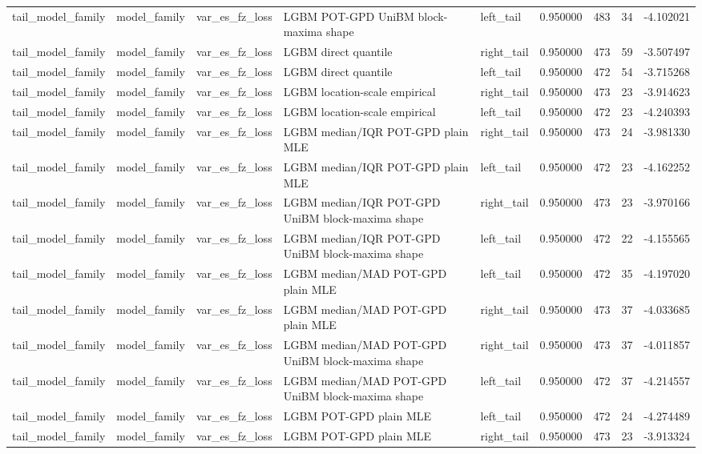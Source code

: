 \begin{tabular}{lllllrrr}
tail\_model\_family & model\_family & var\_es\_fz\_loss & LGBM POT-GPD UniBM block-maxima shape & left\_tail & 0.950000 & 483 & 34 & -4.102021 \\
tail\_model\_family & model\_family & var\_es\_fz\_loss & LGBM direct quantile & right\_tail & 0.950000 & 473 & 59 & -3.507497 \\
tail\_model\_family & model\_family & var\_es\_fz\_loss & LGBM direct quantile & left\_tail & 0.950000 & 472 & 54 & -3.715268 \\
tail\_model\_family & model\_family & var\_es\_fz\_loss & LGBM location-scale empirical & right\_tail & 0.950000 & 473 & 23 & -3.914623 \\
tail\_model\_family & model\_family & var\_es\_fz\_loss & LGBM location-scale empirical & left\_tail & 0.950000 & 472 & 23 & -4.240393 \\
tail\_model\_family & model\_family & var\_es\_fz\_loss & LGBM median/IQR POT-GPD plain MLE & right\_tail & 0.950000 & 473 & 24 & -3.981330 \\
tail\_model\_family & model\_family & var\_es\_fz\_loss & LGBM median/IQR POT-GPD plain MLE & left\_tail & 0.950000 & 472 & 23 & -4.162252 \\
tail\_model\_family & model\_family & var\_es\_fz\_loss & LGBM median/IQR POT-GPD UniBM block-maxima shape & right\_tail & 0.950000 & 473 & 23 & -3.970166 \\
tail\_model\_family & model\_family & var\_es\_fz\_loss & LGBM median/IQR POT-GPD UniBM block-maxima shape & left\_tail & 0.950000 & 472 & 22 & -4.155565 \\
tail\_model\_family & model\_family & var\_es\_fz\_loss & LGBM median/MAD POT-GPD plain MLE & left\_tail & 0.950000 & 472 & 35 & -4.197020 \\
tail\_model\_family & model\_family & var\_es\_fz\_loss & LGBM median/MAD POT-GPD plain MLE & right\_tail & 0.950000 & 473 & 37 & -4.033685 \\
tail\_model\_family & model\_family & var\_es\_fz\_loss & LGBM median/MAD POT-GPD UniBM block-maxima shape & right\_tail & 0.950000 & 473 & 37 & -4.011857 \\
tail\_model\_family & model\_family & var\_es\_fz\_loss & LGBM median/MAD POT-GPD UniBM block-maxima shape & left\_tail & 0.950000 & 472 & 37 & -4.214557 \\
tail\_model\_family & model\_family & var\_es\_fz\_loss & LGBM POT-GPD plain MLE & left\_tail & 0.950000 & 472 & 24 & -4.274489 \\
tail\_model\_family & model\_family & var\_es\_fz\_loss & LGBM POT-GPD plain MLE & right\_tail & 0.950000 & 473 & 23 & -3.913324 \\

\end{tabular}
